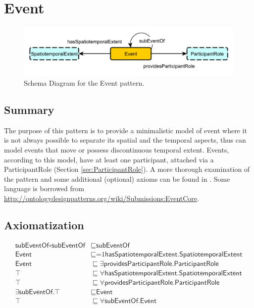 \section{Event}
\label{sec:Event}
\begin{figure}[h!]
\begin{center}
\includegraphics[width=.8\textwidth]{figures/event}
\end{center}
\caption{Schema Diagram for the Event pattern.}
\label{fig:Event}
\end{figure}
\subsection{Summary}
\label{sum:Event}
The purpose of this pattern is to provide a minimalistic model of event where it is not always possible to separate its spatial and the temporal aspects, thus can model events that move or possess discontinuous temporal extent. Events, according to this model, have at least one participant, attached via a \textsf{ParticipantRole} (Section \ref{sec:ParticipantRole}). A more thorough examination of the pattern and some additional (optional) axioms can be found in \cite{event}. Some language is borrowed from \url{http://ontologydesignpatterns.org/wiki/Submissions:EventCore}.

\subsection{Axiomatization}
\label{axs:Event}
\begin{align}
\textsf{subEventOf} \circ \textsf{subEventOf} &\sqsubseteq \textsf{subEventOf} \\
\textsf{Event} &\sqsubseteq \text{=1} \textsf{hasSpatiotemporalExtent.SpatiotemporalExtent} \\
\textsf{Event} &\sqsubseteq \exists \textsf{providesParticipantRole.ParticipantRole} \\
\top &\sqsubseteq \forall \textsf{hasSpatiotemporalExtent.SpatiotemporalExtent} \\
\top &\sqsubseteq \forall \textsf{providesParticipantRole.ParticipantRole} \\
\exists \textsf{subEventOf.}\top &\sqsubseteq \textsf{Event} \\
\top &\sqsubseteq \forall \textsf{subEventOf.Event}
\end{align}

